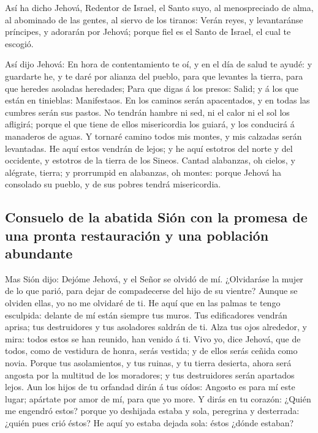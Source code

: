  Así ha dicho Jehová, Redentor de Israel, el Santo suyo, al
menospreciado de alma, al abominado de las gentes, al siervo de los
tiranos: Verán reyes, y levantaránse príncipes, y adorarán por Jehová;
porque fiel es el Santo de Israel, el cual te escogió.

 Así dijo Jehová: En hora de contentamiento te oí, y en el
día de salud te ayudé: y guardarte he, y te daré por alianza del pueblo,
para que levantes la tierra, para que heredes asoladas heredades;
 Para que digas á los presos: Salid; y á los que están en
tinieblas: Manifestaos. En los caminos serán apacentados, y en todas las
cumbres serán sus pastos.  No tendrán hambre ni sed, ni el
calor ni el sol los afligirá; porque el que tiene de ellos misericordia
los guiará, y los conducirá á manaderos de aguas.  Y
tornaré camino todos mis montes, y mis calzadas serán levantadas.
 He aquí estos vendrán de lejos; y he aquí estotros del
norte y del occidente, y estotros de la tierra de los Sineos.
 Cantad alabanzas, oh cielos, y alégrate, tierra; y
prorrumpid en alabanzas, oh montes: porque Jehová ha consolado su
pueblo, y de sus pobres tendrá misericordia.

\hypertarget{consuelo-de-la-abatida-siuxf3n-con-la-promesa-de-una-pronta-restauraciuxf3n-y-una-poblaciuxf3n-abundante}{%
\subsection{Consuelo de la abatida Sión con la promesa de una pronta
restauración y una población
abundante}\label{consuelo-de-la-abatida-siuxf3n-con-la-promesa-de-una-pronta-restauraciuxf3n-y-una-poblaciuxf3n-abundante}}

 Mas Sión dijo: Dejóme Jehová, y el Señor se olvidó de mí.
 ¿Olvidaráse la mujer de lo que parió, para dejar de
compadecerse del hijo de su vientre? Aunque se olviden ellas, yo no me
olvidaré de ti.  He aquí que en las palmas te tengo
esculpida: delante de mí están siempre tus muros.  Tus
edificadores vendrán aprisa; tus destruidores y tus asoladores saldrán
de ti.  Alza tus ojos alrededor, y mira: todos estos se han
reunido, han venido á ti. Vivo yo, dice Jehová, que de todos, como de
vestidura de honra, serás vestida; y de ellos serás ceñida como novia.
 Porque tus asolamientos, y tus ruinas, y tu tierra
desierta, ahora será angosta por la multitud de los moradores; y tus
destruidores serán apartados lejos.  Aun los hijos de tu
orfandad dirán á tus oídos: Angosto es para mí este lugar; apártate por
amor de mí, para que yo more.  Y dirás en tu corazón:
¿Quién me engendró estos? porque yo deshijada estaba y sola, peregrina y
desterrada: ¿quién pues crió éstos? He aquí yo estaba dejada sola: éstos
¿dónde estaban?

